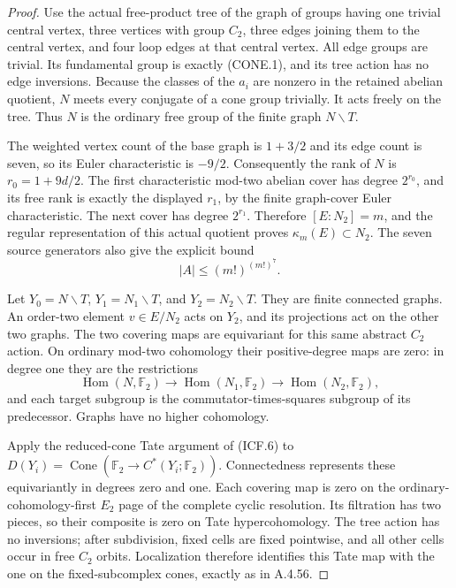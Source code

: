 \begin{proof}
Use the actual free-product tree of the graph of groups having one
trivial central vertex, three vertices with group $C_2$, three edges
joining them to the central vertex, and four loop edges at that
central vertex.  All edge groups are trivial.  Its fundamental group
is exactly (CONE.1), and its tree action has no edge inversions.
Because the classes of the $a_i$ are nonzero in the retained
abelian quotient, $N$ meets every conjugate of a cone group trivially.
It acts freely on the tree.  Thus $N$ is the ordinary free group
of the finite graph $N\backslash T$.

The weighted vertex count of the base graph is $1+3/2$ and its
edge count is seven, so its Euler characteristic is $-9/2$.
Consequently the rank of $N$ is $r_0=1+9d/2$.
The first characteristic mod-two abelian cover has degree $2^{r_0}$,
and its free rank is exactly the displayed $r_1$, by the finite
graph-cover Euler characteristic.  The next cover has degree
$2^{r_1}$.  Therefore $[E:N_2]=m$, and the regular representation
of this actual quotient proves $\kappa_m(E)\subset N_2$.
The seven source generators also give the explicit bound
\[
                         |A|\leq(m!)^{(m!)^7}.
                                                               \tag{CONE.6}
\]

Let $Y_0=N\backslash T$, $Y_1=N_1\backslash T$, and
$Y_2=N_2\backslash T$.  They are finite connected graphs.  An
order-two element $v\in E/N_2$ acts on $Y_2$, and its projections
act on the other two graphs.  The two covering maps are equivariant
for this same abstract $C_2$ action.  On ordinary mod-two cohomology
their positive-degree maps are zero: in degree one they are the
restrictions
\[
 \operatorname{Hom}(N,\mathbb F_2)\longrightarrow
 \operatorname{Hom}(N_1,\mathbb F_2)\longrightarrow
 \operatorname{Hom}(N_2,\mathbb F_2),
                                                               \tag{CONE.7}
\]
and each target subgroup is the commutator-times-squares subgroup
of its predecessor.  Graphs have no higher cohomology.

Apply the reduced-cone Tate argument of (ICF.6) to
$D(Y_i)=\operatorname{Cone}(\mathbb F_2\to C^*(Y_i;\mathbb F_2))$.
Connectedness represents these equivariantly in degrees zero and
one.  Each covering map is zero on the ordinary-cohomology-first
$E_2$ page of the complete cyclic resolution.  Its filtration has
two pieces, so their composite is zero on Tate hypercohomology.
The tree action has no inversions; after subdivision, fixed cells
are fixed pointwise, and all other cells occur in free $C_2$ orbits.
Localization therefore identifies this Tate map with the one on
the fixed-subcomplex cones, exactly as in A.4.56.


\end{proof}
